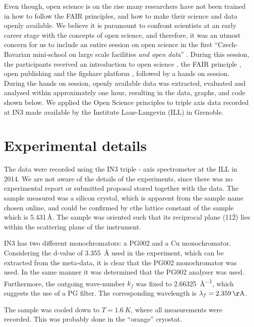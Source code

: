 \documentclass[aps,reprint,amsmath,amssymb,superscriptaddress]{revtex4-1}
\begin{document}
Even though, open science is on the rise many researchers have not been trained in how to follow the FAIR principles, and how to make their science and data openly available.
We believe it is paramount to confront scientists at an early career stage with the concepts of open science, and therefore, it was an utmost concern for us to include an entire session on open science in the first ``Czech-Bavarian mini-school on large scale facilities \emph{and open data}'' \cite{mini-school}.
During this session, the participants received an introduction to open science \cite{foster}, the FAIR principle \cite{FAIR}, open publishing \cite{arXiv} and the figshare platform \cite{figshare}, followed by a hands on session.
During the hands on session, openly available data was extracted, evaluated and analysed within approximately one hour, resulting in the data, graphs, and code \cite{data-evaluation, data-docker} shown below.
We applied the Open Science principles to triple axis data recorded at IN3 \cite{data} made available by the Institute Laue-Langevin (ILL) in Grenoble.

\section{Experimental details}

The data were recorded using the IN3 triple - axis spectrometer \cite{IN3} at the ILL in 2014.
We are not aware of the details of the experiments, since there was no experimental report or submitted proposal stored together with the data.
The sample measured was a silicon crystal, which is apparent from the sample name chosen online, and could be confirmed by cthe lattice constant of the sample which is 5.431\,\AA \cite{Hom1975}. The sample was oriented such that its reciprocal plane (11$\bar{2}$) lies within the scattering plane of the instrument.


IN3 has two different monochromators: a PG002 and a Cu monochromator.
Considering the d-value of \SI{3.355}{\AA} used in the experiment, which can be extracted from the meta-data, it is clear that the PG002 monochromator was used.
In the same manner it was determined that the PG002 analyser was used. 
Furthermore, the outgoing wave-number $k_f$ was fixed to \SI{2.66325}{\AA^{-1}}, which suggests the use of a PG filter. 
The corresponding wavelength is $\lambda_f=\SI{2.359}{\AA}$.

The sample was cooled down to $T = \SI{1.6}{K}$, where all measurements were recorded. 
This was probably done in the ``orange'' cryostat.
\end{document}
